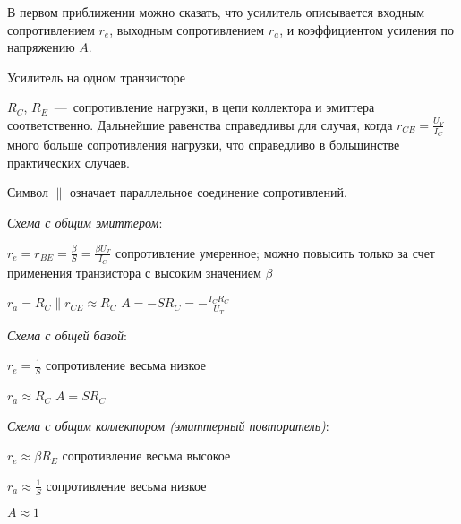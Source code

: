 \documentclass[
a4paper
,11pt
,landscape
,russian
,twocolumn
]{letter}
\newcommand\vsp{\vspace{.2in}}
\newcommand\tto{\tabto{2in}}
\begin{document}
В первом приближении можно сказать, что усилитель описывается
входным сопротивлением $r_e$, выходным сопротивлением $r_a$, и
коэффициентом усиления по напряжению $A$.

\vsp

\begin{Large}
Усилитель на одном транзисторе
\end{Large}

\vsp

$R_C$, $R_E$~---~сопротивление нагрузки, в цепи коллектора и
эмиттера соответственно. Дальнейшие равенства справедливы для
случая, когда $r_{CE}=\frac{U_Y}{I_C}$ много больше сопротивления
нагрузки, что справедливо в большинстве практических случаев.

Символ $\|$ означает параллельное соединение сопротивлений.

\vsp

\begin{raggedright}

\textit{Схема с общим эмиттером}:

$r_e=r_{BE}=\frac{\beta}{S}=\frac{\beta U_T}{I_C}$
\tto
{\small сопротивление умеренное; можно повысить}
\linebreak
\tto
{\small только за счет применения транзистора}
\linebreak
\tto
{\small с высоким значением} $\beta$

$r_a=R_C\|r_{CE}\approx R_C$
\hspace{.2in}
$A=-S R_C=-\frac{I_C R_C}{U_T}$

\vsp

\textit{Схема с общей базой}:

$r_e=\frac{1}{S}$
\tto
{\small сопротивление весьма низкое}

$r_a\approx R_C$
\hspace{.2in}
$A=S R_C$

\vsp

\textit{Схема с общим коллектором (эмиттерный повторитель)}:

$r_e\approx\beta R_E$
\tto
{\small сопротивление весьма высокое}

$r_a\approx\frac{1}{S}$
\tto
{\small сопротивление весьма низкое}

$A\approx 1$

\end{raggedright}
\end{document}
